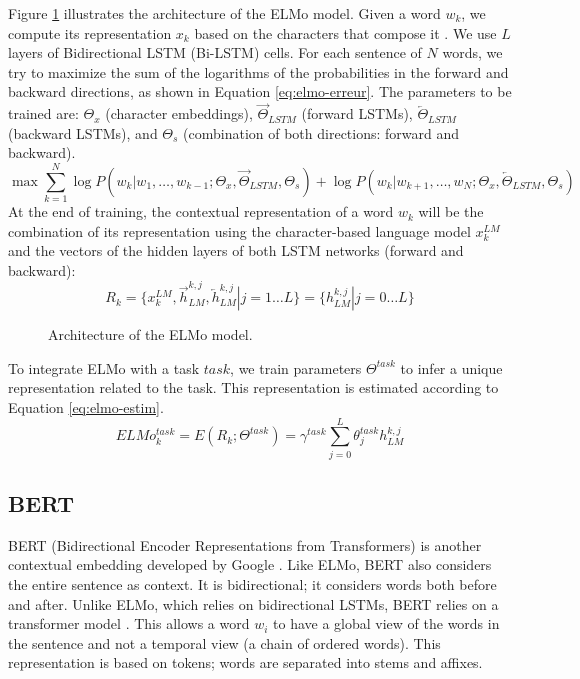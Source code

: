 \documentclass{KBook}
\begin{document}
Figure \ref{fig:elmo-arch} illustrates the architecture of the ELMo model. Given a word $w_k$, we compute its representation $x_k$ based on the characters that compose it \cite{2015-kim-al}. We use $L$ layers of Bidirectional LSTM (Bi-LSTM) cells. For each sentence of $N$ words, we try to maximize the sum of the logarithms of the probabilities in the forward and backward directions, as shown in Equation \ref{eq:elmo-erreur}. The parameters to be trained are: $\Theta_x$ (character embeddings), $\overrightarrow{\Theta}_{LSTM}$ (forward LSTMs), $\overleftarrow{\Theta}_{LSTM}$ (backward LSTMs), and $\Theta_s$ (combination of both directions: forward and backward).
\begin{equation}
	\max \sum_{k=1}^{N} 
	\log P(w_k | w_1,\ldots,w_{k-1}; \Theta_x, \overrightarrow{\Theta}_{LSTM}, \Theta_s)
	+
	\log P(w_k | w_{k+1},\ldots,w_{N}; \Theta_x, \overleftarrow{\Theta}_{LSTM}, \Theta_s)
	\label{eq:elmo-erreur}
\end{equation}
At the end of training, the contextual representation of a word $w_k$ will be the combination of its representation using the character-based language model $x_k^{LM}$ and the vectors of the hidden layers of both LSTM networks (forward and backward): 
\[
R_k = \{x_k^{LM}, \overrightarrow{h}_{LM}^{k, j}, \overleftarrow{h}_{LM}^{k, j} | j= 1 \ldots L \}
= \{h_{LM}^{k, j} | j= 0 \ldots L \}
\]

\begin{figure}[ht]
	\centering
	\caption{Architecture of the ELMo model.}
	\label{fig:elmo-arch}
\end{figure}

To integrate ELMo with a task $task$, we train parameters $\Theta^{task}$ to infer a unique representation related to the task. This representation is estimated according to Equation \ref{eq:elmo-estim}.
\begin{equation}
	ELMo_k^{task} = E(R_k; \Theta^{task}) = \gamma^{task} \sum_{j=0}^{L} \theta_j^{task} h_{LM}^{k, j}
	\label{eq:elmo-estim}
\end{equation}


\subsection{BERT}

BERT (Bidirectional Encoder Representations from Transformers) is another contextual embedding developed by Google \cite{2019-devlin-al}.
Like ELMo, BERT also considers the entire sentence as context.
It is bidirectional; it considers words both before and after.
Unlike ELMo, which relies on bidirectional LSTMs, BERT relies on a transformer model \cite{2017-vaswani-al}.
This allows a word $w_i$ to have a global view of the words in the sentence and not a temporal view (a chain of ordered words).
This representation is based on tokens; words are separated into stems and affixes.
\end{document}
